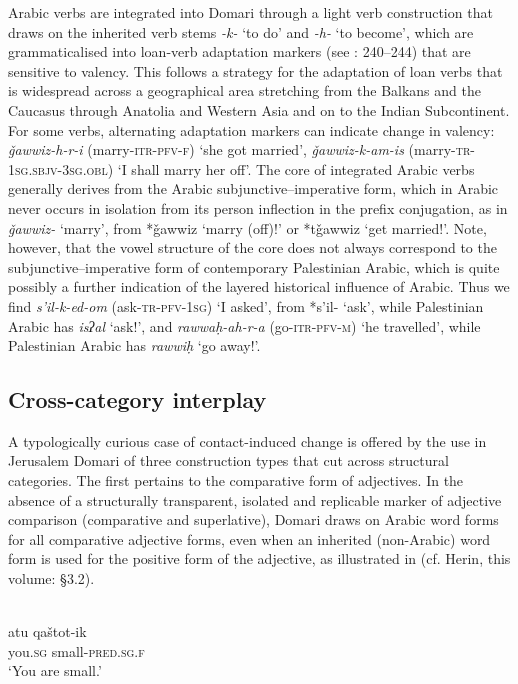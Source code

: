 \documentclass[output=paper]{langsci/langscibook}
\begin{document}
Arabic verbs are integrated into Domari through a light verb construction that draws on the inherited verb stems \textit{-k-} ‘to do’ and \textit{-h-} ‘to become’, which are grammaticalised into loan-verb adaptation markers (see \citealt{Matras2012}: 240–244) that are sensitive to valency. This follows a strategy for the adaptation of loan verbs that is widespread across a geographical area stretching from the Balkans and the Caucasus through Anatolia and Western Asia and on to the Indian Subcontinent. For some verbs, alternating adaptation markers can indicate change in valency: \textit{ǧawwiz-h-r-i} (marry-\textsc{itr-pfv-f}) ‘she got married’, \textit{ǧawwiz-k-am-is} (marry-\textsc{tr-1sg.sbjv-3sg.obl}) ‘I shall marry her off’. The core of integrated Arabic verbs generally derives from the Arabic subjunctive–imperative form, which in Arabic never occurs in isolation from its person inflection in the prefix conjugation, as in \textit{ǧawwiz-} ‘marry’, from *ǧawwiz ‘marry (off)!’ or *tǧawwiz ‘get married!’. Note, however, that the vowel structure of the core does not always correspond to the subjunctive–imperative form of contemporary Palestinian Arabic, which is quite possibly a further indication of the layered historical influence of Arabic. Thus we find \textit{s’il-k-ed-om} (ask-\textsc{tr-pfv-1sg}) ‘I asked’, from *s’il- ‘ask’, while Palestinian Arabic has \textit{isʔal} ‘ask!’, and \textit{rawwaḥ-ah-r-a} (go-\textsc{itr-pfv-m}) ‘he travelled’, while Palestinian Arabic has \textit{rawwiḥ} ‘go away!’.

\subsection{Cross-category interplay
}

A typologically curious case of contact-induced change is offered by the use in Jerusalem Domari of three construction types that cut across structural categories. The first pertains to the comparative form of adjectives. In the absence of a structurally transparent, isolated and replicable marker of adjective comparison (comparative and superlative), Domari draws on Arabic word forms for all comparative adjective forms, even when an inherited (non-Arabic) word form is used for the positive form of the adjective, as illustrated in  (cf. Herin, this volume: §3.2).

\ea\label{comp}
\ea
{}\\
\gll atu qaštot-ik    \\
           you.\textsc{sg} small-\textsc{pred.sg.f}\\
\glt       ‘You are small.’
\end{document}
